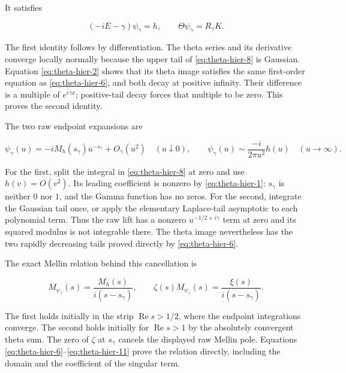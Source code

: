 It satisfies

\begin{equation}
(-iE-\gamma)\psi_\gamma=h,
 \qquad \Theta\psi_\gamma=R_\gamma K.
 \label{eq:theta-hier-9}
\end{equation}

The first identity follows by differentiation. The theta series and its derivative converge locally normally because the upper tail of \eqref{eq:theta-hier-8} is Gaussian. Equation \eqref{eq:theta-hier-2} shows that its theta image satisfies the same first-order equation as \eqref{eq:theta-hier-6}, and both decay at positive infinity. Their difference is a multiple of $e^{i\gamma x}$; positive-tail decay forces that multiple to be zero. This proves the second identity.

The two raw endpoint expansions are

\begin{equation}
\psi_\gamma(u)=-iM_h(s_\gamma)u^{-s_\gamma}+O_\gamma(u^2)
       \quad(u\downarrow0),
 \qquad
 \psi_\gamma(u)\sim\frac{-i}{2\pi u^2}h(u)
       \quad(u\to\infty).
 \label{eq:theta-hier-10}
\end{equation}

For the first, split the integral in \eqref{eq:theta-hier-8} at zero and use $h(v)=O(v^2)$. Its leading coefficient is nonzero by \eqref{eq:theta-hier-1}: $s_\gamma$ is neither $0$ nor $1$, and the Gamma function has no zeros. For the second, integrate the Gaussian tail once, or apply the elementary Laplace-tail asymptotic to each polynomial term. Thus the raw lift has a nonzero $u^{-1/2+i\gamma}$ term at zero and its squared modulus is not integrable there. The theta image nevertheless has the two rapidly decreasing tails proved directly by \eqref{eq:theta-hier-6}.

The exact Mellin relation behind this cancellation is

\begin{equation}
M_{\psi_\gamma}(s)=\frac{M_h(s)}{i(s-s_\gamma)},\qquad
 \zeta(s)M_{\psi_\gamma}(s)=\frac{\xi(s)}{i(s-s_\gamma)}.
 \label{eq:theta-hier-11}
\end{equation}

The first holds initially in the strip $\operatorname{Re}s>1/2$, where the endpoint integrations converge. The second holds initially for $\operatorname{Re}s>1$ by the absolutely convergent theta sum. The zero of $\zeta$ at $s_\gamma$ cancels the displayed raw Mellin pole. Equations \eqref{eq:theta-hier-6}--\eqref{eq:theta-hier-11} prove the relation directly, including the domain and the coefficient of the singular term.

